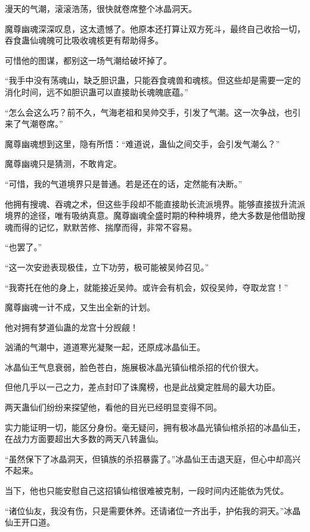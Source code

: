 
\begin{this_body}

漫天的气潮，滚滚浩荡，很快就卷席整个冰晶洞天。

魔尊幽魂深深叹息，这太遗憾了。他原本还打算让双方死斗，最终自己收拾一切，吞食蛊仙魂魄可比吸收魂核更有帮助得多。

可惜他的图谋，都别这一场气潮给破坏掉了。

“我手中没有荡魂山，缺乏胆识蛊，只能吞食魂兽和魂核。但这些却是需要一定的消化时间，远不如胆识蛊可以直接助长魂魄底蕴。”

“怎么会这么巧？前不久，气海老祖和吴帅交手，引发了气潮。这一次争战，也引来了气潮卷席。”

魔尊幽魂想到这里，隐有所悟：“难道说，蛊仙之间交手，会引发气潮么？”

魔尊幽魂只是猜测，不敢肯定。

“可惜，我的气道境界只是普通。若是还在的话，定然能有决断。”

他拥有搜魂、吞魂之术，但这些手段却不能直接助长流派境界。能够直接拔升流派境界的途径，唯有吸纳真意。魔尊幽魂全盛时期的种种境界，绝大多数是他借助搜魂而得的记忆，默默苦修、揣摩而得，非常不容易。

“也罢了。”

“这一次安逊表现极佳，立下功劳，极可能被吴帅召见。”

“我寄托在他的身上，就能接近吴帅。或许会有机会，奴役吴帅，夺取龙宫！”

魔尊幽魂一计不成，又生出全新的计划。

他对拥有梦道仙蛊的龙宫十分觊觎！

汹涌的气潮中，道道寒光凝聚一起，还原成冰晶仙王。

冰晶仙王气息衰弱，脸色苍白，施展极冰晶光镇仙棺杀招的代价很大。

但他几乎以一己之力，差点封印了诛魔榜，也是此战奠定胜局的最大功臣。

两天蛊仙们纷纷来探望他，看他的目光已经明显变得不同。

实力能证明一切，能区分身份。毫无疑问，拥有极冰晶光镇仙棺杀招的冰晶仙王，在战力方面要超出大多数的两天八转蛊仙。

“虽然保下了冰晶洞天，但镇族的杀招暴露了。”冰晶仙王击退天庭，但心中却高兴不起来。

当下，他也只能安慰自己这招镇仙棺很难被克制，一段时间内还能依为凭仗。

“诸位仙友，我没有伤，只是需要休养。还请诸位一齐出手，护佑我的洞天。”冰晶仙王开口道。


\end{this_body}
